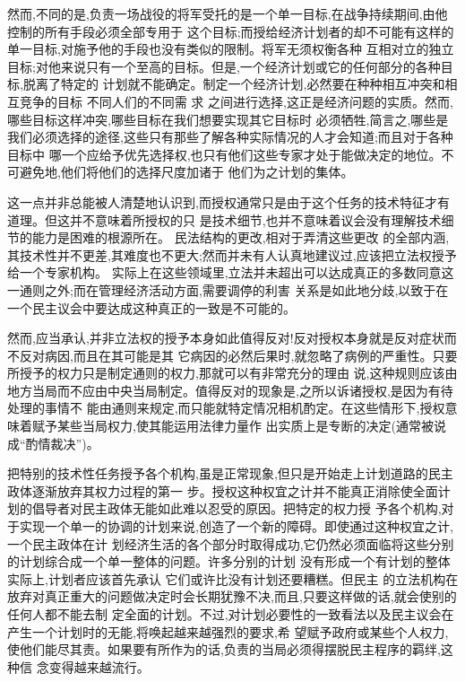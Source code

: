 ﻿\documentclass[12pt]{article}
\begin{document}
然而,不同的是,负责一场战役的将军受托的是一个单一目标,在战争持续期间,由他控制的所有手段必须全部专用于
这个目标;而授给经济计划者的却不可能有这样的单一目标,对施予他的手段也没有类似的限制。将军无须权衡各种
互相对立的独立目标;对他来说只有一个至高的目标。但是,一个经济计划或它的任何部分的各种目标,脱离了特定的
计划就不能确定。制定一个经济计划,必然要在种种相互冲突和相互竞争的目标 \myrule 不同人们的不同需
求 \myrule 之间进行选择,这正是经济问题的实质。然而,哪些目标这样冲突,哪些目标在我们想要实现其它目标时
必须牺牲,简言之,哪些是我们必须选择的途径,这些只有那些了解各种实际情况的人才会知道;而且对于各种目标中
哪一个应给予优先选择权,也只有他们这些专家才处于能做决定的地位。不可避免地,他们将他们的选择尺度加诸于
他们为之计划的集体。

这一点并非总能被人清楚地认识到,而授权通常只是由于这个任务的技术特征才有道理。但这并不意味着所授权的只
是技术细节,也并不意味着议会没有理解技术细节的能力是困难的根源所在。 民法结构的更改,相对于弄清这些更改
的全部内涵,其技术性并不更差,其难度也不更大;然而并未有人认真地建议过,应该把立法权授予给一个专家机构。
实际上在这些领域里,立法并未超出可以达成真正的多数同意这一通则之外;而在管理经济活动方面,需要调停的利害
关系是如此地分歧,以致于在一个民主议会中要达成这种真正的一致是不可能的。

然而,应当承认,并非立法权的授予本身如此值得反对!反对授权本身就是反对症状而不反对病因,而且在其可能是其
它病因的必然后果时,就忽略了病例的严重性。只要所授予的权力只是制定通则的权力,那就可以有非常充分的理由
说,这种规则应该由地方当局而不应由中央当局制定。值得反对的现象是,之所以诉诸授权,是因为有待处理的事情不
能由通则来规定,而只能就特定情况相机酌定。在这些情形下,授权意味着赋予某些当局权力,使其能运用法律力量作
出实质上是专断的决定(通常被说成``酌情裁决'')。

把特别的技术性任务授予各个机构,虽是正常现象,但只是开始走上计划道路的民主政体逐渐放弃其权力过程的第一
步。授权这种权宜之计并不能真正消除使全面计划的倡导者对民主政体无能如此难以忍受的原因。把特定的权力授
予各个机构,对于实现一个单一的协调的计划来说,创造了一个新的障碍。即使通过这种权宜之计,一个民主政体在计
划经济生活的各个部分时取得成功,它仍然必须面临将这些分别的计划综合成一个单一整体的问题。许多分别的计划
没有形成一个有计划的整体 \myrule 实际上,计划者应该首先承认 \myrule 它们或许比没有计划还要糟糕。但民主
的立法机构在放弃对真正重大的问题做决定时会长期犹豫不决,而且,只要这样做的话,就会使别的任何人都不能去制
定全面的计划。不过,对计划必要性的一致看法以及民主议会在产生一个计划时的无能,将唤起越来越强烈的要求,希
望赋予政府或某些个人权力,使他们能尽其责。如果要有所作为的话,负责的当局必须得摆脱民主程序的羁绊,这种信
念变得越来越流行。
\end{document}
